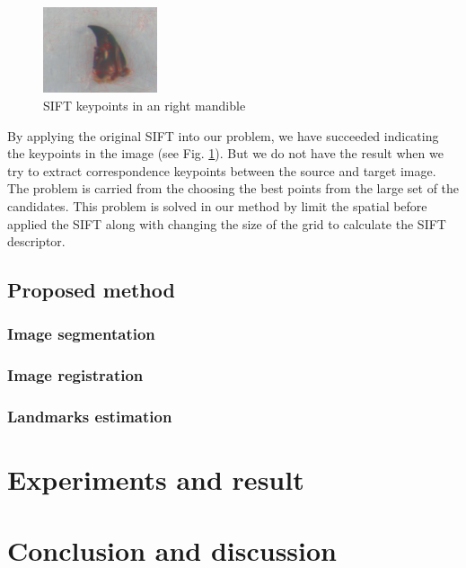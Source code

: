 \documentclass{gretsi}
\begin{document}
\begin{figure}[htb]
    \centering
    \includegraphics[width=0.3\textwidth]{./images/mdsift}
    \caption{SIFT keypoints in an right mandible}
    \label{fig3}
\end{figure}

By applying the original SIFT into our problem, we have succeeded indicating the keypoints in the image (see Fig. \ref{fig3}). But we do not have the result when we try to extract correspondence keypoints between the source and target image. The problem is carried from the choosing the best points from the large set of the candidates. This problem is solved in our method by limit the spatial before applied the SIFT along with changing the size of the grid to calculate the SIFT descriptor.
\subsection{Proposed method}
\subsubsection{Image segmentation}
\subsubsection{Image registration}
\subsubsection{Landmarks estimation}
\section{Experiments and result}
\section{Conclusion and discussion}
\end{document}
